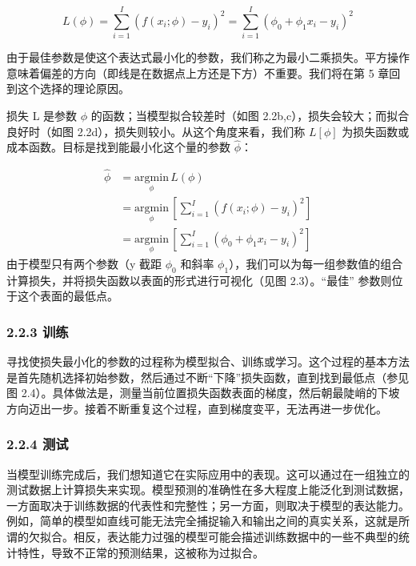 \documentclass[
]{article}
\begin{document}
\[
L(\phi) = \sum_{i=1}^{I} (f(x_i; \phi) - y_i)^2 = \sum_{i=1}^{I} (\phi_0 + \phi_1 x_i - y_i)^2 \tag{2.5}
\]

由于最佳参数是使这个表达式最小化的参数，我们称之为最小二乘损失。平方操作意味着偏差的方向（即线是在数据点上方还是下方）不重要。我们将在第
5 章回到这个选择的理论原因。

损失 L 是参数 \(\phi\) 的函数；当模型拟合较差时（如图
2.2b,c），损失会较大；而拟合良好时（如图
2.2d），损失则较小。从这个角度来看，我们称 \(L[\phi]\)
为损失函数或成本函数。目标是找到能最小化这个量的参数 \(\hat \phi\)：

\[
\begin{align}
\hat{\phi} &= \underset{\phi}{\mathrm{argmin}} \, L(\phi) \\
&= \underset{\phi}{\mathrm{argmin}} \, \left[ \sum_{i=1}^{I} (f(x_i; \phi) - y_i)^2 \right] \\
&= \underset{\phi}{\mathrm{argmin}} \, \left[ \sum_{i=1}^{I} (\phi_0 + \phi_1 x_i - y_i)^2 \right] \tag{2.6}
\end{align}
\] 由于模型只有两个参数（y 截距 \(\phi_0\) 和斜率
\(\phi_1\)），我们可以为每一组参数值的组合计算损失，并将损失函数以表面的形式进行可视化（见图
2.3）。``最佳'' 参数则位于这个表面的最低点。

\hypertarget{ux8badux7ec3}{%
\subsubsection{2.2.3 训练}\label{ux8badux7ec3}}

寻找使损失最小化的参数的过程称为模型拟合、训练或学习。这个过程的基本方法是首先随机选择初始参数，然后通过不断``下降''损失函数，直到找到最低点（参见图
2.4）。具体做法是，测量当前位置损失函数表面的梯度，然后朝最陡峭的下坡方向迈出一步。接着不断重复这个过程，直到梯度变平，无法再进一步优化。

\hypertarget{ux6d4bux8bd5}{%
\subsubsection{2.2.4 测试}\label{ux6d4bux8bd5}}

当模型训练完成后，我们想知道它在实际应用中的表现。这可以通过在一组独立的测试数据上计算损失来实现。模型预测的准确性在多大程度上能泛化到测试数据，一方面取决于训练数据的代表性和完整性；另一方面，则取决于模型的表达能力。例如，简单的模型如直线可能无法完全捕捉输入和输出之间的真实关系，这就是所谓的欠拟合。相反，表达能力过强的模型可能会描述训练数据中的一些不典型的统计特性，导致不正常的预测结果，这被称为过拟合。
\end{document}
